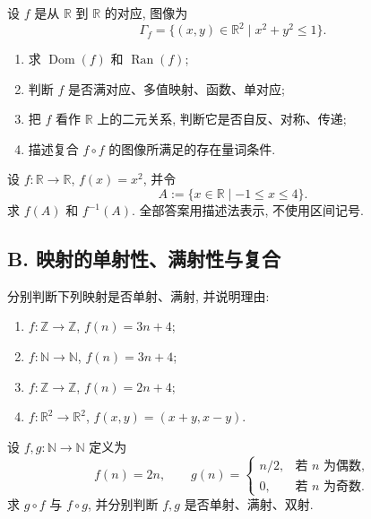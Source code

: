 \documentclass[usesamecnt, thmcnt=section, lang=cn, newtx, 10pt, scheme=chinese]{elegantbook}
\begin{document}
\begin{exercise}\label{ex:corr-end-02}
设 $f$ 是从 $\mathbb R$ 到 $\mathbb R$ 的对应, 图像为
\[
 \Gamma_f=\{(x,y)\in\mathbb R^2\mid x^2+y^2\leq1\}.
\]
\begin{enumerate}[label=\rm(\arabic*)]
  \item 求 $\operatorname{Dom}(f)$ 和 $\operatorname{Ran}(f)$;
  \item 判断 $f$ 是否满对应、多值映射、函数、单对应;
  \item 把 $f$ 看作 $\mathbb R$ 上的二元关系, 判断它是否自反、对称、传递;
  \item 描述复合 $f\circ f$ 的图像所满足的存在量词条件.
\end{enumerate}
\end{exercise}

\begin{exercise}\label{ex:corr-end-03}
设 $f:\mathbb R\to\mathbb R$, $f(x)=x^2$, 并令
\[
 A:=\{x\in\mathbb R\mid -1\leq x\leq4\}.
\]
求 $f(A)$ 和 $f^{-1}(A)$. 全部答案用描述法表示, 不使用区间记号.
\end{exercise}

\subsection*{B. 映射的单射性、满射性与复合}

\begin{exercise}\label{ex:corr-end-04}
分别判断下列映射是否单射、满射, 并说明理由:
\begin{enumerate}[label=\rm(\arabic*)]
  \item $f:\mathbb Z\to\mathbb Z$, $f(n)=3n+4$;
  \item $f:\mathbb N\to\mathbb N$, $f(n)=3n+4$;
  \item $f:\mathbb Z\to\mathbb Z$, $f(n)=2n+4$;
  \item $f:\mathbb R^2\to\mathbb R^2$, $f(x,y)=(x+y,x-y)$.
\end{enumerate}
\end{exercise}

\begin{exercise}\label{ex:corr-end-05}
设 $f,g:\mathbb N\to\mathbb N$ 定义为
\[
 f(n)=2n,
 \qquad
 g(n)=
 \begin{cases}
 n/2,&\text{若 $n$ 为偶数},\\
 0,&\text{若 $n$ 为奇数}.
 \end{cases}
\]
求 $g\circ f$ 与 $f\circ g$, 并分别判断 $f,g$ 是否单射、满射、双射.
\end{exercise}
\end{document}
